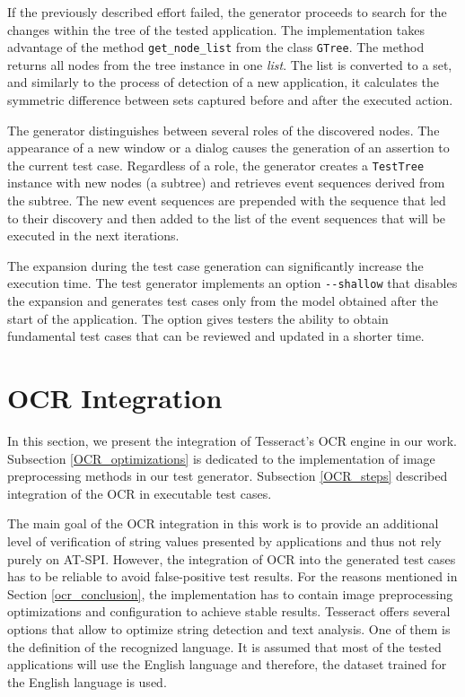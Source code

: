 If the previously described effort failed, the generator proceeds to search for the changes within the tree of the tested application. The implementation takes advantage of the method \texttt{get\_node\_list} from the class \texttt{GTree}. The method returns all nodes from the tree instance in one \textit{list}. The list is converted to a set, and similarly to the process of detection of a new application, it calculates the symmetric difference between sets captured before and after the executed action. 

The generator distinguishes between several roles of the discovered nodes. The appearance of a new window or a dialog causes the generation of an assertion to the current test case. Regardless of a role, the generator creates a \texttt{TestTree} instance with new nodes (a subtree) and retrieves event sequences derived from the subtree. The new event sequences are prepended with the sequence that led to their discovery and then added to the list of the event sequences that will be executed in the next iterations.

The expansion during the test case generation can significantly increase the execution time. The test generator implements an option \texttt{{-}{-}shallow} that disables the expansion and generates test cases only from the model obtained after the start of the application. The option gives testers the ability to obtain fundamental test cases that can be reviewed and updated in a shorter time.


\section{OCR Integration}\label{OCR}
In this section, we present the integration of Tesseract's OCR engine in our work. Subsection \ref{OCR_optimizations} is dedicated to the implementation of image preprocessing methods in our test generator. Subsection \ref{OCR_steps} described integration of the OCR in executable test cases.  

The main goal of the OCR integration in this work is to provide an additional level of verification of string values presented by applications and thus not rely purely on AT-SPI.
However, the integration of OCR into the generated test cases has to be reliable to avoid false-positive test results. For the reasons mentioned in Section \ref{ocr_conclusion}, the implementation has to contain image preprocessing optimizations and configuration to achieve stable results. Tesseract offers several options that allow to optimize string detection and text analysis. One of them is the definition of the recognized language. It is assumed that most of the tested applications will use the English language and therefore, the dataset trained for the English language is used.

